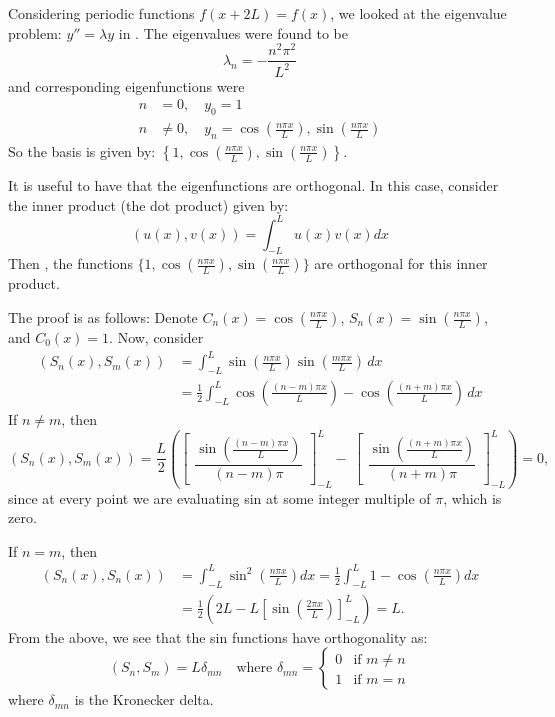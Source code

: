 Considering periodic functions $f(x+2L) = f(x)$, we looked at the eigenvalue problem: $y'' = \lambda y$ in . The eigenvalues were found to be
\[
\lambda_n = -\frac{n^2 \pi^2}{L^2} 
\]
and corresponding eigenfunctions were 
\begin{align*}
	n &= 0, \quad y_0 = 1 \\
	n &\neq 0, \quad y_n = \cos{\left(\frac{n \pi x}{L}\right)}, \sin{\left(\frac{n \pi x}{L}\right)}
\end{align*}
So the basis is given by: $\left\{1, \cos{(\frac{n \pi x}{L})}, \sin{(\frac{n \pi x}{L})}\right\}$.

It is useful to have that the eigenfunctions are orthogonal. In this case, consider the inner product (the dot product) given by:
\begin{equation}\label{eq:innerprod}
	(u(x), v(x)) = \int_{-L}^L u(x) v(x) dx
\end{equation}
Then , the functions $\{1, \cos{(\frac{n \pi x}{L})}, \sin{(\frac{n \pi x}{L})}\}$ are orthogonal for this inner product.

The proof is as follows: Denote $C_n(x) = \cos{(\frac{n \pi x}{L})}$, $S_n(x) = \sin{(\frac{n \pi x}{L})}$, and $C_0(x)=1$. Now, consider
\begin{align*}
	\left(S_n(x), S_m(x)\right) &= \int_{-L}^L \sin{\left(\frac{n \pi x}{L}\right)} \sin{\left(\frac{m \pi x}{L}\right)} \,dx \\
	&= \frac{1}{2} \int_{-L}^L \cos{\left(\frac{(n-m) \pi x}{L}\right)} - \cos{\left(\frac{(n+m) \pi x}{L}\right)} \,dx
\end{align*}
If $n \neq m$, then
\[
\left(S_n(x), S_m(x)\right) = \frac{L}{2} \left(  \begin{bmatrix}\dfrac{\sin{\left(\frac{(n-m) \pi x}{L} \right)} }{(n-m) \pi} \end{bmatrix}_{-L}^L - \ \begin{bmatrix} \dfrac{\sin{\left(\frac{(n+m) \pi x}{L} \right)} }{(n+m) \pi} \end{bmatrix}_{-L}^L \right) = 0,
\]
since at every point we are evaluating sin at some integer multiple of $\pi$, which is zero.

If $n = m$, then
\begin{align*}
	\left(S_n(x), S_n(x)\right) & = \int^L_{-L} \sin^2{\left(\frac{n \pi x}{L}\right)} dx = \frac{1}{2} \int^L_{-L} 1 - \cos{\left(\frac{n \pi x}{L}\right)} dx \\
	&= \frac{1}{2}\left( 2L - L \left[ \sin{\left(\frac{2 \pi x}{L} \right)} \right]_{-L}^L \right) = L.
\end{align*}
From the above, we see that the sin functions have orthogonality as:
\[
(S_n, S_m) = L \delta_{mn} \quad \text{where } \delta_{mn} = \begin{cases}0 & \text{if } m \neq n \\ 1 & \text{if } m = n
\end{cases}
\]
where $\delta_{mn}$ is the Kronecker delta.

